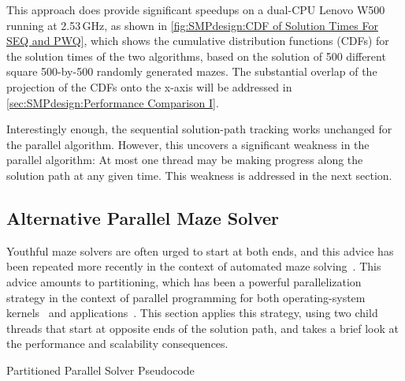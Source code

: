 This approach does provide significant speedups on a dual-CPU
Lenovo W500 running at 2.53\,GHz, as shown in
\cref{fig:SMPdesign:CDF of Solution Times For SEQ and PWQ},
which shows the cumulative distribution functions (CDFs) for the solution
times of the two algorithms, based on the solution of 500 different square
500-by-500 randomly generated mazes.
The substantial overlap
of the projection of the CDFs onto the x-axis will be addressed in
\cref{sec:SMPdesign:Performance Comparison I}.

Interestingly enough, the sequential solution-path tracking works unchanged
for the parallel algorithm.
However, this uncovers a significant weakness in the parallel algorithm:
At most one thread may be making progress along the solution path at
any given time.
This weakness is addressed in the next section.

\subsection{Alternative Parallel Maze Solver}
\label{sec:SMPdesign:Alternative Parallel Maze Solver}

Youthful maze solvers are often urged to start at both ends, and
this advice has been repeated more recently in the context of automated
maze solving~\cite{UMD:CMSC433maze}.
This advice amounts to partitioning, which has been a powerful
parallelization strategy
in the context of parallel programming for both operating-system
kernels~\cite{Beck85,Inman85} and
applications~\cite{DavidAPatterson2010TroubleMulticore}.
This section applies this strategy, using two child threads that start
at opposite ends of the solution path, and takes a brief look at the
performance and scalability consequences.

\begin{listing}
\begin{fcvlabel}
\end{fcvlabel}
\caption{Partitioned Parallel Solver Pseudocode}
\label{lst:SMPdesign:Partitioned Parallel Solver Pseudocode}
\end{listing}

